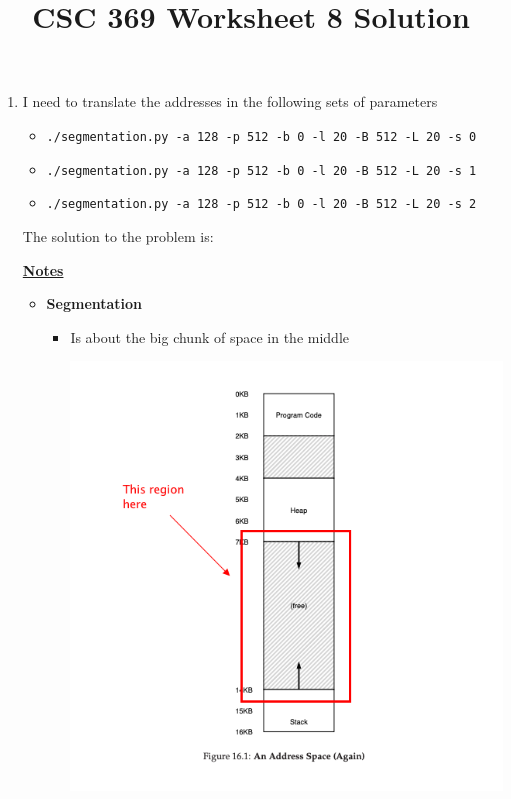 \documentclass[12pt]{article}
\begin{document}
\title{CSC 369 Worksheet 8 Solution}

\maketitle

\bigskip

\begin{enumerate}[1.]
    \item

    \bigskip

    I need to translate the addresses in the following sets of parameters

    \begin{itemize}
        \item \texttt{./segmentation.py -a 128 -p 512 -b 0 -l 20 -B 512 -L 20 -s 0}
        \item \texttt{./segmentation.py -a 128 -p 512 -b 0 -l 20 -B 512 -L 20 -s 1}
        \item \texttt{./segmentation.py -a 128 -p 512 -b 0 -l 20 -B 512 -L 20 -s 2}
    \end{itemize}

    \bigskip

    The solution to the problem is:


    \bigskip

    \underline{\textbf{Notes}}

    \begin{itemize}
        \item \textbf{Segmentation}

        \begin{itemize}
            \item Is about the big chunk of space in the middle

            \begin{center}
            \includegraphics[width=0.8\linewidth]{images/worksheet_8_solution_1.png}
            \end{center}


\end{itemize}
\end{itemize}
\end{enumerate}
\end{document}
